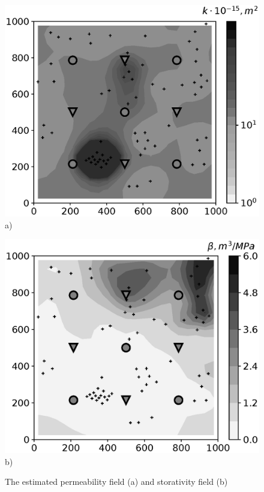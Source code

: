 \documentclass[
11pt,%
tightenlines,%
twoside,%
onecolumn,%
nofloats,%
nobibnotes,%
nofootinbib,%
superscriptaddress,%
noshowpacs,%
centertags]%
{revtex4}
\begin{document}
\begin{figure}
	\begin{minipage}[h]{0.48\linewidth}
		\centering
		\includegraphics[height=0.80\linewidth]{images/fig5a.eps}\\
		a)
		\label{fig:mob}
	\end{minipage} \hfill
	\begin{minipage}[h]{0.48\linewidth}
		\centering
		\includegraphics[height=0.80\linewidth]{images/fig5b.eps} \\
		b)
		\label{fig:comp}
	\end{minipage}
	\caption{The estimated permeability field (a) and storativity field (b)}
\end{figure}
\end{document}
